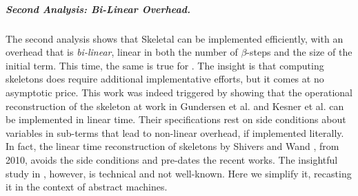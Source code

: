 \subparagraph{Second Analysis: Bi-Linear Overhead.} The second analysis  shows that Skeletal \cbneed can be implemented efficiently, with an overhead that is \emph{bi-linear}, \ie linear in both the number of $\beta$-steps and the size of the initial term. This time, the same is true for \cbneed. The insight is that computing  skeletons  does require additional implementative efforts, but it comes at no asymptotic price.
This work was indeed triggered by showing that the operational reconstruction of the skeleton at work in Gundersen et al. \cite{DBLP:conf/lics/GundersenHP13} and Kesner et al. \cite{DBLP:journals/lmcs/KesnerPV24} can be implemented in linear time. Their specifications rest on side conditions about variables in sub-terms that lead to non-linear overhead, if implemented literally. In fact, the linear time reconstruction of skeletons by Shivers and Wand \cite{DBLP:journals/fuin/ShiversW10}, from 2010, avoids the side conditions  and pre-dates the recent works. The insightful study in \cite{DBLP:journals/fuin/ShiversW10}, however, is technical and not well-known. Here we simplify it, recasting it in the context of abstract machines.

